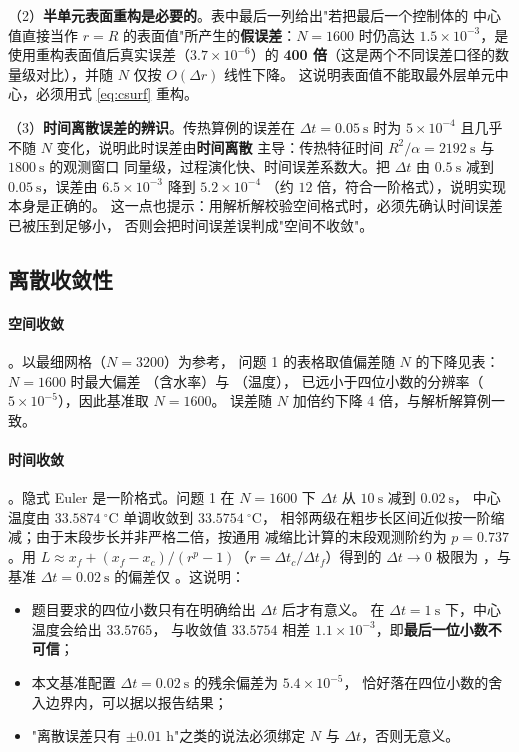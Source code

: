（2）\textbf{半单元表面重构是必要的}。表中最后一列给出"若把最后一个控制体的
中心值直接当作 $r=R$ 的表面值"所产生的\textbf{假误差}：$N=1600$ 时仍高达
$1.5\times10^{-3}$，是使用重构表面值后真实误差（$3.7\times10^{-6}$）的
\textbf{400 倍}（这是两个不同误差口径的数量级对比），并随 $N$ 仅按
$O(\Delta r)$ 线性下降。
这说明表面值不能取最外层单元中心，必须用式 \eqref{eq:csurf} 重构。

（3）\textbf{时间离散误差的辨识}。传热算例的误差在 $\Delta t=0.05\ \mathrm{s}$
时为 $5\times10^{-4}$ 且几乎不随 $N$ 变化，说明此时误差由\textbf{时间离散}
主导：传热特征时间 $R^2/\alpha=2192\ \mathrm{s}$ 与 $1800\ \mathrm{s}$ 的观测窗口
同量级，过程演化快、时间误差系数大。把 $\Delta t$ 由 $0.5\ \mathrm{s}$ 减到
$0.05\ \mathrm{s}$，误差由 $6.5\times10^{-3}$ 降到 $5.2\times10^{-4}$
（约 $12$ 倍，符合一阶格式），说明实现本身是正确的。
这一点也提示：用解析解校验空间格式时，必须先确认时间误差已被压到足够小，
否则会把时间误差误判成"空间不收敛"。

\subsection{离散收敛性}

\paragraph{空间收敛}。以最细网格（$N=3200$）为参考，
问题 1 的表格取值偏差随 $N$ 的下降见表：$N=1600$ 时最大偏差
（含水率）与 （温度），
已远小于四位小数的分辨率（$5\times10^{-5}$），因此基准取 $N=1600$。
误差随 $N$ 加倍约下降 4 倍，与解析解算例一致。

\paragraph{时间收敛}。隐式 Euler 是一阶格式。问题 1 在 $N=1600$ 下
$\Delta t$ 从 $10\ \mathrm{s}$ 减到 $0.02\ \mathrm{s}$，
中心温度由 $33.5874\ ^\circ\mathrm{C}$ 单调收敛到 $33.5754\ ^\circ\mathrm{C}$，
相邻两级在粗步长区间近似按一阶缩减；由于末段步长并非严格二倍，按通用
减缩比计算的末段观测阶约为 $p=\text{0.737}$。用
$L\approx x_f+(x_f-x_c)/(r^p-1)$（$r=\Delta t_c/\Delta t_f$）得到的
$\Delta t\to0$ 极限为
，与基准 $\Delta t=0.02\ \mathrm{s}$ 的偏差仅
。这说明：

\begin{itemize}[leftmargin=2.2em,itemsep=0.2em]
  \item 题目要求的四位小数只有在明确给出 $\Delta t$ 后才有意义。
        在 $\Delta t=1\ \mathrm{s}$ 下，中心温度会给出 $33.5765$，
        与收敛值 $33.5754$ 相差 $1.1\times10^{-3}$，即\textbf{最后一位小数不可信}；
  \item 本文基准配置 $\Delta t=0.02\ \mathrm{s}$ 的残余偏差为 $5.4\times10^{-5}$，
        恰好落在四位小数的舍入边界内，可以据以报告结果；
  \item "离散误差只有 $\pm0.01$ h"之类的说法必须绑定 $N$ 与 $\Delta t$，否则无意义。
\end{itemize}

